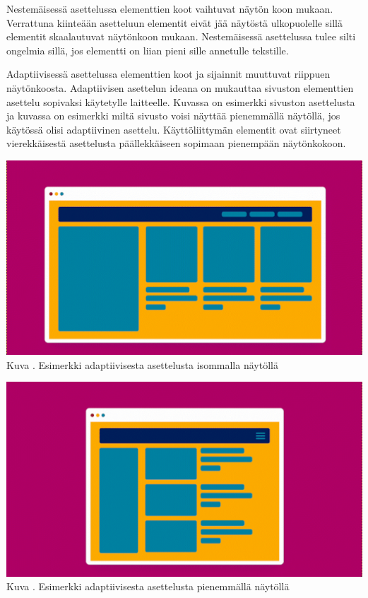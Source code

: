 \documentclass[11pt,a4paper,titlepage,oneside]{article}
\begin{document}
Nestemäisessä asettelussa elementtien koot vaihtuvat näytön koon mukaan. 
Verrattuna kiinteään asetteluun elementit eivät jää näytöstä ulkopuolelle sillä elementit skaalautuvat näytönkoon mukaan.
Nestemäisessä asettelussa tulee silti ongelmia sillä, jos elementti on liian pieni sille annetulle tekstille.
\medskip


Adaptiivisessä asettelussa elementtien koot ja sijainnit muuttuvat riippuen näytönkoosta.
Adaptiivisen asettelun ideana on mukauttaa sivuston elementtien asettelu sopivaksi käytetylle laitteelle.
Kuvassa \nextImageCount {} on esimerkki sivuston asettelusta ja
kuvassa \nextnextImageCount{} on esimerkki miltä sivusto voisi näyttää pienemmällä näytöllä, jos käytössä olisi adaptiivinen asettelu.
Käyttöliittymän elementit ovat siirtyneet vierekkäisestä asettelusta päällekkäiseen sopimaan pienempään näytönkokoon.
\medskip


\bigskip
\includegraphics[width = 15cm]{src/public/oppar/adaptiveBig.png}\\
Kuva \getImgCount {}. Esimerkki adaptiivisesta asettelusta isommalla näytöllä 
 
\bigskip

\includegraphics[width = 15cm]{src/public/oppar/adaptivesmall.png}\\
Kuva \getImgCount {}. Esimerkki adaptiivisesta asettelusta pienemmällä näytöllä
\end{document}
